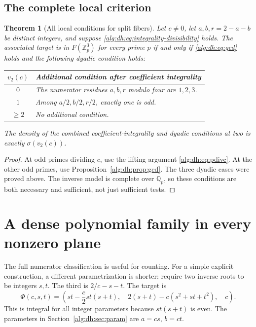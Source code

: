 \documentclass[11pt]{article}
\numberwithin{equation}{section}
\newtheorem{theorem}{Theorem}[section]
\theoremstyle{plain}
\theoremstyle{plain}
\theoremstyle{plain}
\theoremstyle{definition}
\theoremstyle{definition}
\theoremstyle{definition}
\theoremstyle{remark}
\newcommand{\Z}{\mathbb Z}\newcommand{\Q}{\mathbb Q}
\begin{document}
\subsection{The complete local criterion}
\begin{theorem}[All local conditions for split fibers]\label{alg:dh:thm:local-complete}
Let $c\ne0$, let $a,b,r=2-a-b$ be distinct integers, and suppose
\eqref{alg:dh:eq:integrality-divisibility} holds. The associated target is in
$F(\Z_p^3)$ for every prime $p$ if and only if
\eqref{alg:dh:eq:gcd} holds and the following dyadic condition holds:
\begin{center}
\begin{tabular}{c p{}}
\toprule
$v_2(c)$ & Additional condition after coefficient integrality\\
\midrule
$0$ & The numerator residues $a,b,r$ modulo four are $1,2,3$.\\
$1$ & Among $a/2,b/2,r/2$, exactly one is odd.\\
$\ge2$ & No additional condition.\\
\bottomrule
\end{tabular}
\end{center}
The density of the combined coefficient-integrality and dyadic conditions
at two is exactly $\sigma(v_2(c))$.
\end{theorem}
\begin{proof}
At odd primes dividing $c$, use the lifting argument
\eqref{alg:dh:eq:pdivc}. At the other odd primes, use
Proposition~\ref{alg:dh:prop:gcd}. The three dyadic cases were proved above.
The inverse model is complete over $\Q_p$, so these conditions are both
necessary and sufficient, not just sufficient tests.
\end{proof}

\section{A dense polynomial family in every nonzero plane}\label{alg:dh:sec:dense}
The full numerator classification is useful for counting. For a simple
explicit construction, a different parametrization is shorter: require
two inverse roots to be integers $s,t$. The third is $2/c-s-t$.
The target is
\begin{equation}\label{alg:dh:eq:Phi}
 \Phi(c,s,t)=\left(
 st-\frac c2st(s+t),\quad
 2(s+t)-c(s^2+st+t^2),\quad c
 \right).
\end{equation}
This is integral for all integer parameters because $st(s+t)$ is even.
The parameters in Section~\ref{alg:dh:sec:param} are $a=cs$, $b=ct$.
\end{document}
